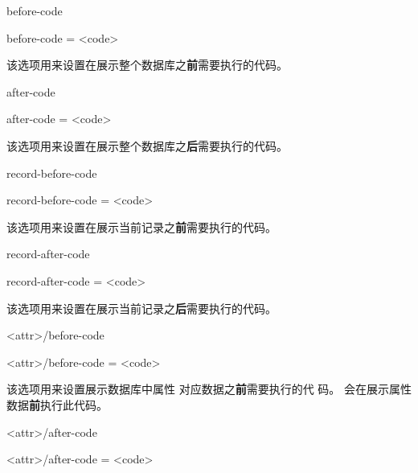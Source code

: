 \documentclass[full]{l3doc}
\def\zhbefore{\textbf{前}}
\def\zhafter{\textbf{后}}
\begin{document}
\begin{documentation}
\begin{option}[added=2022-01-05, rEXP]{before-code}
  \begin{syntax}
    before-code = <code>
  \end{syntax}

  该选项用来设置在展示整个数据库之\zhbefore 需要执行的代码。
\end{option}

\begin{option}[added=2022-01-05, rEXP]{after-code}
  \begin{syntax}
    after-code = <code>
  \end{syntax}

  该选项用来设置在展示整个数据库之\zhafter 需要执行的代码。
\end{option}

\begin{option}[added=2022-01-05, rEXP]{record-before-code}
  \begin{syntax}
    record-before-code = <code>
  \end{syntax}

  该选项用来设置在展示当前记录之\zhbefore 需要执行的代码。
\end{option}

\begin{option}[added=2022-01-05, rEXP]{record-after-code}
  \begin{syntax}
    record-after-code = <code>
  \end{syntax}

  该选项用来设置在展示当前记录之\zhafter 需要执行的代码。
\end{option}

\begin{option}[added=2022-01-05, rEXP]{<attr>/before-code}
  \begin{syntax}
    <attr>/before-code = <code>
  \end{syntax}

  该选项用来设置展示数据库中属性  对应数据之\zhbefore 需要执行的代
  码。 会在展示属性数据\zhbefore 执行此代码。
\end{option}

\begin{option}[added=2022-01-05, rEXP]{<attr>/after-code}
  \begin{syntax}
    <attr>/after-code = <code>
  \end{syntax}


\end{option}
\end{documentation}
\end{document}
